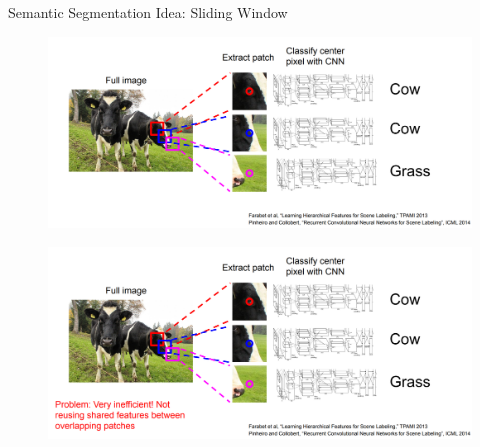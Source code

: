 \documentclass[10pt]{beamer}
\theoremstyle{remark}
\theoremstyle{definition}
\begin{document}
\begin{frame}[allowframebreaks]{Semantic Segmentation Idea: Sliding Window}
\begin{figure}
\centering
\includegraphics[width=1.0\textwidth,height=1.0\textheight,keepaspectratio]{./images/sem_3.png}
\end{figure}

\framebreak

\begin{figure}
\centering
\includegraphics[width=1.0\textwidth,height=1.0\textheight,keepaspectratio]{./images/sem_4.png}
\end{figure}
    
\end{frame}
\end{document}
